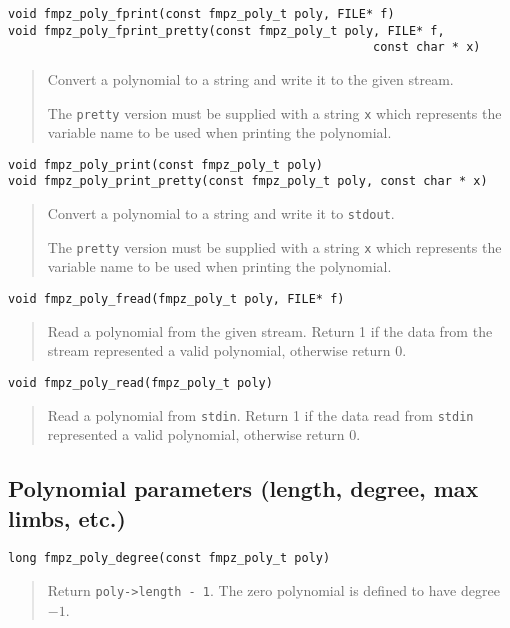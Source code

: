 \documentclass[a4paper,10pt]{article}
\newcommand{\code}{\lstinline}
\begin{document}
\begin{lstlisting}
void fmpz_poly_fprint(const fmpz_poly_t poly, FILE* f)
void fmpz_poly_fprint_pretty(const fmpz_poly_t poly, FILE* f, 
                                                   const char * x)
\end{lstlisting}
\begin{quote}
Convert a polynomial to a string and write it to the given stream. 

The \code{pretty} version must be supplied with a string \code{x} which represents the variable name to be used when printing the polynomial.
\end{quote}

\begin{lstlisting}
void fmpz_poly_print(const fmpz_poly_t poly)
void fmpz_poly_print_pretty(const fmpz_poly_t poly, const char * x)
\end{lstlisting}
\begin{quote}
Convert a polynomial to a string and write it to \code{stdout}. 

The \code{pretty} version must be supplied with a string \code{x} which represents the variable name to be used when printing the polynomial.
\end{quote}

\begin{lstlisting}
void fmpz_poly_fread(fmpz_poly_t poly, FILE* f)
\end{lstlisting}
\begin{quote}
Read a polynomial from the given stream. Return 1 if the data from the stream represented a valid polynomial, otherwise return 0.
\end{quote}

\begin{lstlisting}
void fmpz_poly_read(fmpz_poly_t poly)
\end{lstlisting}
\begin{quote}
Read a polynomial from \code{stdin}. Return 1 if the data read from \code{stdin} represented a valid polynomial, otherwise return 0.
\end{quote}

\subsection{Polynomial parameters (length, degree, max limbs, etc.)}

\begin{lstlisting}
long fmpz_poly_degree(const fmpz_poly_t poly)
\end{lstlisting}
\begin{quote}
Return \code{poly->length - 1}. The zero polynomial is defined to have degree $-1$.
\end{quote}
\end{document}
